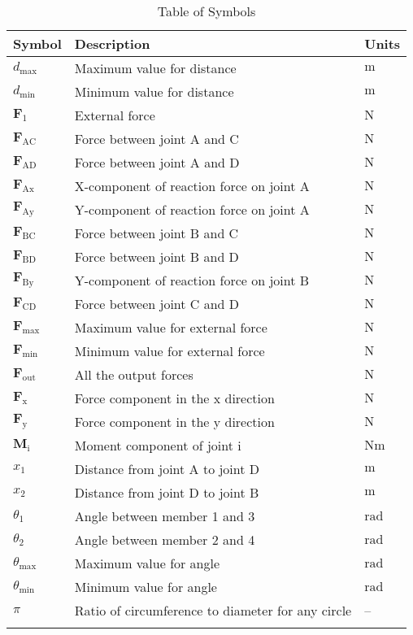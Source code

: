 \documentclass[12pt]{article}
\begin{document}
\begin{longtable}{l l l}
\toprule
\textbf{Symbol} & \textbf{Description} & \textbf{Units}
\\
\midrule
\endhead
${d_{\text{max}}}$ & Maximum value for distance & ${\text{m}}$
\\
${d_{\text{min}}}$ & Minimum value for distance & ${\text{m}}$
\\
${\mathbf{F}_{1}}$ & External force & ${\text{N}}$
\\
${\mathbf{F}_{\text{AC}}}$ & Force between joint A and C & ${\text{N}}$
\\
${\mathbf{F}_{\text{AD}}}$ & Force between joint A and D & ${\text{N}}$
\\
${\mathbf{F}_{\text{Ax}}}$ & X-component of reaction force on joint A & ${\text{N}}$
\\
${\mathbf{F}_{\text{Ay}}}$ & Y-component of reaction force on joint A & ${\text{N}}$
\\
${\mathbf{F}_{\text{BC}}}$ & Force between joint B and C & ${\text{N}}$
\\
${\mathbf{F}_{\text{BD}}}$ & Force between joint B and D & ${\text{N}}$
\\
${\mathbf{F}_{\text{By}}}$ & Y-component of reaction force on joint B & ${\text{N}}$
\\
${\mathbf{F}_{\text{CD}}}$ & Force between joint C and D & ${\text{N}}$
\\
${\mathbf{F}_{\text{max}}}$ & Maximum value for external force & ${\text{N}}$
\\
${\mathbf{F}_{\text{min}}}$ & Minimum value for external force & ${\text{N}}$
\\
${\mathbf{F}_{\text{out}}}$ & All the output forces & ${\text{N}}$
\\
${\mathbf{F}_{\text{x}}}$ & Force component in the x direction & ${\text{N}}$
\\
${\mathbf{F}_{\text{y}}}$ & Force component in the y direction & ${\text{N}}$
\\
${\mathbf{M}_{\text{i}}}$ & Moment component of joint i & $\text{N}\text{m}$
\\
${x_{\text{1}}}$ & Distance from joint A to joint D & ${\text{m}}$
\\
${x_{\text{2}}}$ & Distance from joint D to joint B & ${\text{m}}$
\\
${θ_{\text{1}}}$ & Angle between member 1 and 3 & ${\text{rad}}$
\\
${θ_{\text{2}}}$ & Angle between member 2 and 4 & ${\text{rad}}$
\\
${θ_{\text{max}}}$ & Maximum value for angle & ${\text{rad}}$
\\
${θ_{\text{min}}}$ & Minimum value for angle & ${\text{rad}}$
\\
$π$ & Ratio of circumference to diameter for any circle & --
\\
\bottomrule
\caption{Table of Symbols}
\label{Table:ToS}
\end{longtable}
\end{document}
